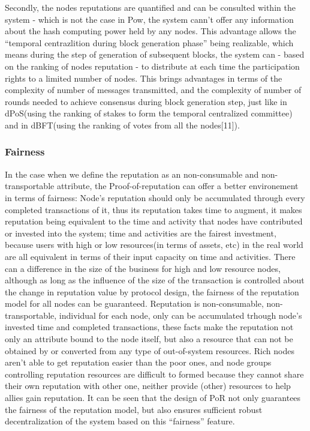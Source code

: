 \documentclass[doublespacing]{bmcart}
\begin{document}
\begin{CJK*}{UTF8}{gbsn}
Secondly, the nodes reputations are quantified and can be consulted within the system - which is not the case in Pow, the system cann't offer any information about the hash computing power held by any nodes. This advantage allows the ``temporal centrazlition during block generation phase'' being realizable, which means during the step of generation of subsequent blocks, the system can - based on the ranking of nodes reputation - to distribute at each time the participation rights to a limited number of nodes. This brings advantages in terms of the complexity of number of messages transmitted, and the complexity of number of rounds needed to achieve consensus during block generation step, just like in dPoS(using the ranking of stakes to form the temporal centralized committee) and in dBFT(using the ranking of votes from all the nodes[11]). 
\subsubsection*{Fairness}
In the case when we define the reputation as an non-consumable and non-transportable attribute, the Proof-of-reputation can offer a better environement in terms of fairness: 
 Node's reputation should only be accumulated through every completed transactions of it, thus its reputation takes time to augment, it makes reputation being equivalent to the time and activity that nodes have contributed or invested into the system; time and activities are the fairest investment, because users with high or low resources(in terms of assets, etc) in the real world are all equivalent in terms of their input capacity on time and activities. There can a difference in the size of the business for high and low resource nodes, although as long as the influence of the size of the transaction is controlled about the change in reputation value by protocol design, the fairness of the reputation model for all nodes can be guaranteed.
 Reputation is non-consumable, non-transportable, individual for each node, only can be accumulated trhough node's invested time and completed transactions, these facts make the reputation not only an attribute bound to the node itself, but also a resource that can not be obtained by or converted from any type of out-of-system resources. Rich nodes aren't able to get reputation easier than the poor ones, and node groups controlling reputation resources are difficult to formed because they cannot share their own reputation with other one, neither provide (other) resources to help allies gain reputation. 
 It can be seen that the design of PoR not only guarantees the fairness of the reputation model, but also ensures sufficient robust decentralization of the system based on this ``fairness'' feature.

\end{CJK*}
\end{document}
